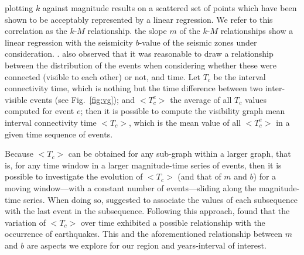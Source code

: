  plotting $k$ against magnitude results on a scattered set of points which have been shown to be acceptably represented by a linear regression. We refer to this correlation as the $k$-$M$ relationship.  the slope $m$ of the $k$-$M$ relationships show a linear regression with the seismicity $b$-value of the seismic zones under consideration.  \citet{Telesca2013, Telesca2014}. \citet{Telesca2014} also observed that it was reasonable to draw a relationship between the distribution of the events when considering whether these were connected (visible to each other) or not, and time. Let $T_c$ be the interval connectivity time, which is nothing but the time difference between two inter-visible events (see Fig.~\ref{fig:vg}); and $<$$T_c^e$$>$ the average of all $T_c$ values computed for event $e$; then it is possible to compute the visibility graph mean interval connectivity time $<$$T_c$$>$, which is the mean value of all $<$$T_c^e$$>$ in a given time sequence of events.

Because $<$$T_c$$>$ can be obtained for any sub-graph within a larger graph, that is, for any time window in a larger magnitude-time series of events, then it is possible to investigate the evolution of $<$$T_c$$>$ (and that of $m$ and $b$) for a moving window---with a constant number of events---sliding along the magnitude-time series. When doing so, \citet{Telesca2016} suggested to associate the values of each subsequence with the last event in the subsequence. Following this approach, \citet{Telesca2016} found that the variation of $<$$T_c$$>$ over time exhibited a possible relationship with the occurrence of earthquakes. This and the aforementioned relationship between $m$ and $b$ are aspects we explore for our region and years-interval of interest.




